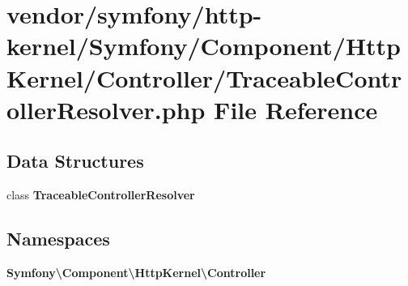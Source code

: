\section{vendor/symfony/http-\/kernel/\+Symfony/\+Component/\+Http\+Kernel/\+Controller/\+Traceable\+Controller\+Resolver.php File Reference}
\label{_traceable_controller_resolver_8php}
\subsection*{Data Structures}
\begin{DoxyCompactItemize}
\item 
class {\bf Traceable\+Controller\+Resolver}
\end{DoxyCompactItemize}
\subsection*{Namespaces}
\begin{DoxyCompactItemize}
\item 
 {\bf Symfony\textbackslash{}\+Component\textbackslash{}\+Http\+Kernel\textbackslash{}\+Controller}
\end{DoxyCompactItemize}
